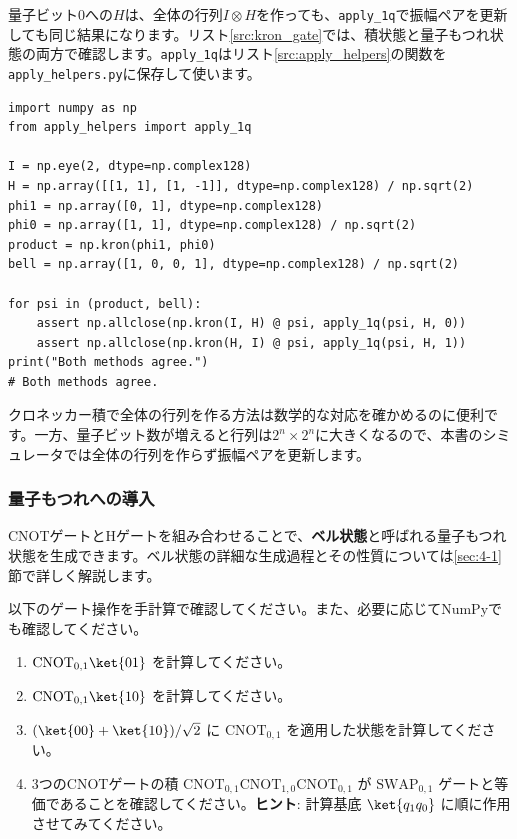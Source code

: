 量子ビット0への$H$は、全体の行列$I\otimes H$を作っても、\texttt{apply\_1q}で振幅ペアを更新しても同じ結果になります。リスト\ref{src:kron_gate}では、積状態と量子もつれ状態の両方で確認します。\texttt{apply\_1q}はリスト\ref{src:apply_helpers}の関数を\texttt{apply\_helpers.py}に保存して使います。

\begin{lstlisting}[caption={クロネッカー積と振幅ペアの更新の比較},label=src:kron_gate]
import numpy as np
from apply_helpers import apply_1q

I = np.eye(2, dtype=np.complex128)
H = np.array([[1, 1], [1, -1]], dtype=np.complex128) / np.sqrt(2)
phi1 = np.array([0, 1], dtype=np.complex128)
phi0 = np.array([1, 1], dtype=np.complex128) / np.sqrt(2)
product = np.kron(phi1, phi0)
bell = np.array([1, 0, 0, 1], dtype=np.complex128) / np.sqrt(2)

for psi in (product, bell):
    assert np.allclose(np.kron(I, H) @ psi, apply_1q(psi, H, 0))
    assert np.allclose(np.kron(H, I) @ psi, apply_1q(psi, H, 1))
print("Both methods agree.")
# Both methods agree.
\end{lstlisting}

クロネッカー積で全体の行列を作る方法は数学的な対応を確かめるのに便利です。一方、量子ビット数が増えると行列は$2^n\times2^n$に大きくなるので、本書のシミュレータでは全体の行列を作らず振幅ペアを更新します。

\subsubsection{量子もつれへの導入}

CNOTゲートとHゲートを組み合わせることで、\textbf{ベル状態}と呼ばれる量子もつれ状態を生成できます。ベル状態の詳細な生成過程とその性質については\ref{sec:4-1}節で詳しく解説します。

\begin{exercise}[CNOTゲートの手計算]
以下のゲート操作を手計算で確認してください。また、必要に応じてNumPyでも確認してください。

\begin{enumerate}
\item $\mathrm{CNOT}_{0,1} \ket{01}$ を計算してください。
\item $\mathrm{CNOT}_{0,1} \ket{10}$ を計算してください。
\item $(\ket{00} + \ket{10})/\sqrt{2}$ に $\mathrm{CNOT}_{0,1}$ を適用した状態を計算してください。
\item 3つのCNOTゲートの積 $\mathrm{CNOT}_{0,1} \mathrm{CNOT}_{1,0} \mathrm{CNOT}_{0,1}$ が $\mathrm{SWAP}_{0,1}$ ゲートと等価であることを確認してください。\textbf{ヒント}: 計算基底 $\ket{q_1 q_0}$ に順に作用させてみてください。
\end{enumerate}
\end{exercise}

